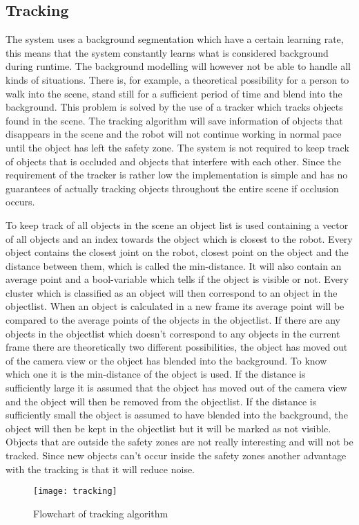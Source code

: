 
\subsection{Tracking}
The system uses a background segmentation which have a certain learning rate, this means that the system constantly learns what is considered background during runtime. The background modelling will however not be able to handle all kinds of situations. There is, for example, a theoretical possibility for a person to walk into the scene, stand still for a sufficient period of time and blend into the background. This problem is solved by the use of a tracker which tracks objects found in the scene. The tracking algorithm will save information of objects that disappears in the scene and the robot will not continue working in normal pace until the object has left the safety zone. The system is not required to keep track of objects that is occluded and objects that interfere with each other. Since the requirement of the tracker is rather low the implementation is simple and has no guarantees of actually tracking objects throughout the entire scene if occlusion occurs.

To keep track of all objects in the scene an object list is used containing a vector of all objects and an index towards the object which is closest to the robot. Every object contains the closest joint on the robot, closest point on the object and the distance between them, which is called the min-distance. It will also contain an average point and a bool-variable which tells if the object is visible or not.  Every cluster which is classified as an object will then correspond to an object in the objectlist. When an object is calculated in a new frame its average point will be compared to the average points of the objects in the objectlist. If there are any objects in the objectlist which doesn’t correspond to any objects in the current frame there are theoretically two different possibilities, the object has moved out of the camera view or the object has blended into the background. To know which one it is the min-distance of the object is used. If the distance is sufficiently large it is assumed that the object has moved out of the camera view and the object will then be removed from the objectlist. If the distance is sufficiently small the object is assumed to have blended into the background, the object will then be kept in the objectlist but it will be marked as not visible. Objects that are outside the safety zones are not really interesting and will not be tracked. Since new objects can’t occur inside the safety zones another advantage with the tracking is that it will reduce noise.

\begin{figure}[H]
\begin{center}
\texttt{[image: tracking]}
\caption{Flowchart of tracking algorithm}
\label{tracking}
\end{center}
\end{figure}
